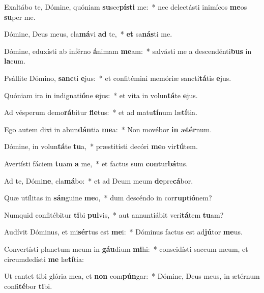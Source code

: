 \item Exaltábo te, Dómine, quóniam \textbf{su}sce\textbf{pís}\textbf{ti} me:~* nec delectásti inimícos \textbf{me}os \textbf{su}per me.
\item Dómine, Deus meus, cla\textbf{má}vi \textbf{ad} te,~* \textbf{et} sa\textbf{nás}ti me.
\item Dómine, eduxísti ab inférno \textbf{á}nimam \textbf{me}am:~* salvásti me a descendénti\textbf{bus} in \textbf{la}cum.
\item Psállite Dómino, \textbf{sanc}ti \textbf{e}jus:~* et confitémini memóriæ sancti\textbf{tá}tis \textbf{e}jus.
\item Quóniam ira in indignati\textbf{ó}ne \textbf{e}jus:~* et vita in volun\textbf{tá}te \textbf{e}jus.
\item Ad vésperum demo\textbf{rá}bitur \textbf{fle}tus:~* et ad matu\textbf{tí}num læ\textbf{tí}tia.
\item Ego autem dixi in abun\textbf{dán}tia \textbf{me}a:~* Non movébor \textbf{in} æ\textbf{tér}num.
\item Dómine, in volun\textbf{tá}te \textbf{tu}a,~* præstitísti decóri \textbf{me}o vir\textbf{tú}tem.
\item Avertísti fáciem \textbf{tu}am \textbf{a} me,~* et factus sum \textbf{con}tur\textbf{bá}tus.
\item Ad te, Dómi\textbf{ne}, cla\textbf{má}bo:~* et ad Deum meum \textbf{de}pre\textbf{cá}bor.
\item Quæ utílitas in \textbf{sán}guine \textbf{me}o,~* dum descéndo in cor\textbf{rup}ti\textbf{ó}nem?
\item Numquid confitébitur \textbf{ti}bi \textbf{pul}vis,~* aut annuntiábit veri\textbf{tá}tem \textbf{tu}am?
\item Audívit Dóminus, et mi\textbf{sér}tus est \textbf{me}i:~* Dóminus factus est ad\textbf{jú}tor \textbf{me}us.
\item Convertísti planctum meum in \textbf{gáu}dium \textbf{mi}hi:~* conscidísti saccum meum, et circumdedísti \textbf{me} læ\textbf{tí}tia:
\item Ut cantet tibi glória mea, et \textbf{non} com\textbf{pún}gar:~* Dómine, Deus meus, in ætérnum confi\textbf{té}bor \textbf{ti}bi.